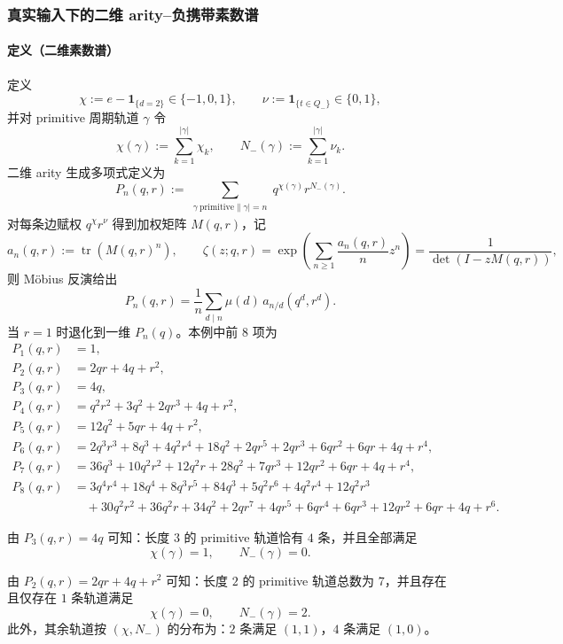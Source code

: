 \subsubsection{真实输入下的二维 arity--负携带素数谱}\label{app:real-input-40-arity-2d}
\paragraph{定义（二维素数谱）}
定义
\[
\chi:=e-\mathbf{1}_{\{d=2\}}\in\{-1,0,1\},
\qquad
\nu:=\mathbf{1}_{\{t\in Q_-\}}\in\{0,1\},
\]
并对 primitive 周期轨道 $\gamma$ 令
\[
\chi(\gamma):=\sum_{k=1}^{|\gamma|}\chi_k,\qquad
N_-(\gamma):=\sum_{k=1}^{|\gamma|}\nu_k.
\]
二维 arity 生成多项式定义为
\[
P_n(q,r):=\sum_{\substack{\gamma\ \mathrm{primitive}\|\gamma|=n}} q^{\chi(\gamma)}r^{N_-(\gamma)}.
\]
对每条边赋权 $q^\chi r^\nu$ 得到加权矩阵 $M(q,r)$，记
\[
a_n(q,r):=\operatorname{tr}(M(q,r)^n),\qquad
\zeta(z;q,r)=\exp\!\left(\sum_{n\ge 1}\frac{a_n(q,r)}{n}z^n\right)
=\frac{1}{\det(I-zM(q,r))},
\]
则 Möbius 反演给出
\[
P_n(q,r)=\frac{1}{n}\sum_{d\mid n}\mu(d)\,a_{n/d}(q^d,r^d).
\]
当 $r=1$ 时退化到一维 $P_n(q)$。本例中前 $8$ 项为
\[
\begin{aligned}
P_1(q,r)&=1,\\
P_2(q,r)&=2qr+4q+r^{2},\\
P_3(q,r)&=4q,\\
P_4(q,r)&=q^{2}r^{2}+3q^{2}+2qr^{3}+4q+r^{2},\\
P_5(q,r)&=12q^{2}+5qr+4q+r^{2},\\
P_6(q,r)&=2q^{3}r^{3}+8q^{3}+4q^{2}r^{4}+18q^{2}+2qr^{5}+2qr^{3}+6qr^{2}+6qr+4q+r^{4},\\
P_7(q,r)&=36q^{3}+10q^{2}r^{2}+12q^{2}r+28q^{2}+7qr^{3}+12qr^{2}+6qr+4q+r^{4},\\
P_8(q,r)&=3q^{4}r^{4}+18q^{4}+8q^{3}r^{5}+84q^{3}+5q^{2}r^{6}+4q^{2}r^{4}+12q^{2}r^{3}\\
&\quad+30q^{2}r^{2}+36q^{2}r+34q^{2}+2qr^{7}+4qr^{5}+6qr^{4}+6qr^{3}+12qr^{2}+6qr+4q+r^{6}.
\end{aligned}
\]
\begin{corollary}\label{cor:real-input-40-arity-2d-rigidity-n3}
由 \(P_3(q,r)=4q\) 可知：长度 \(3\) 的 primitive 轨道恰有 \(4\) 条，并且全部满足
\[
\chi(\gamma)=1,\qquad N_-(\gamma)=0.
\]
\end{corollary}

\begin{corollary}\label{cor:real-input-40-arity-2d-rigidity-n2}
由 \(P_2(q,r)=2qr+4q+r^{2}\) 可知：长度 \(2\) 的 primitive 轨道总数为 \(7\)，并且存在且仅存在 \(1\) 条轨道满足
\[
\chi(\gamma)=0,\qquad N_-(\gamma)=2.
\]
此外，其余轨道按 \((\chi,N_-)\) 的分布为：\(2\) 条满足 \((1,1)\)，\(4\) 条满足 \((1,0)\)。
\end{corollary}

